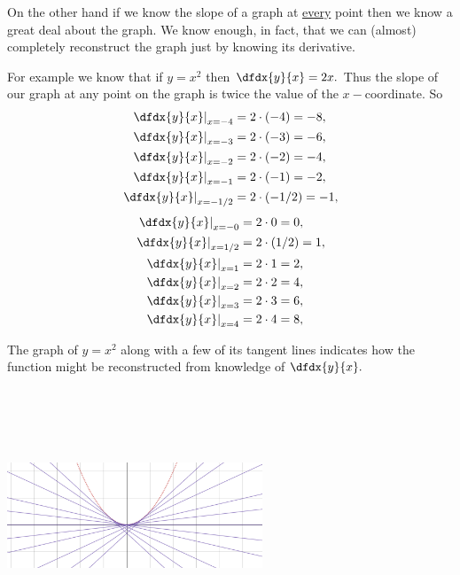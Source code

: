 On the other hand if we know the slope of a graph at \underline{every}
point then we know a great deal about the graph. We know enough, in
fact, that we can (almost) completely reconstruct the graph just by
knowing its derivative.

For example we know that if $y=x^2$ then $\dfdx{y}{x}=2x.$ Thus the
slope of our graph at any point on the graph is twice the value of the
$x-$coordinate. So
\begin{align*}
  \left.\dfdx{y}{x}\right|_{x=-4}&=2\cdot(-4)=-8,\\
  \left.\dfdx{y}{x}\right|_{x=-3}&=2\cdot(-3)=-6,\\
  \left.\dfdx{y}{x}\right|_{x=-2}&=2\cdot(-2)=-4,\\
  \left.\dfdx{y}{x}\right|_{x=-1}&=2\cdot(-1)=-2,\\
  \left.\dfdx{y}{x}\right|_{x=-1/2}&=2\cdot(-1/2)=-1,\\
\end{align*}
\begin{align*}
  \left.\dfdx{y}{x}\right|_{x=-0}&=2\cdot0=0,\\
  \left.\dfdx{y}{x}\right|_{x=1/2}&=2\cdot(1/2)=1,\\
  \left.\dfdx{y}{x}\right|_{x=1}&=2\cdot1=2,\\
  \left.\dfdx{y}{x}\right|_{x=2}&=2\cdot2=4,\\
  \left.\dfdx{y}{x}\right|_{x=3}&=2\cdot3=6,\\
  \left.\dfdx{y}{x}\right|_{x=4}&=2\cdot4=8,\\
\end{align*}

The graph of $y=x^2$ along with a few of its tangent lines indicates
how the function might be reconstructed from knowledge of
$\dfdx{y}{x}.$\\[2mm]
\centerline{\includegraphics*[height=3in,width=3in]{Figures/parab-envelope}}

